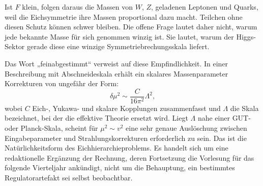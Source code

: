 Ist \(F\) klein, folgen daraus die Massen von \(W\), \(Z\), geladenen Leptonen und Quarks, weil die Eichsymmetrie ihre Massen proportional dazu macht. Teilchen ohne diesen Schutz können schwer bleiben. Die offene Frage lautet daher nicht, warum jede bekannte Masse für sich genommen winzig ist. Sie lautet, warum der Higgs-Sektor gerade diese eine winzige Symmetriebrechungsskala liefert.

\begin{classroomqa}
\end{classroomqa}

Das Wort „feinabgestimmt“ verweist auf diese Empfindlichkeit. In einer Beschreibung mit Abschneideskala erhält ein skalares Massenparameter Korrekturen von ungefähr der Form:
\begin{equation}
  \delta\mu^2
  \sim
  \frac{C}{16\pi^2}\Lambda^2,
  \label{eq:l10-higgs-quadratic-sensitivity}
\end{equation}
wobei \(C\) Eich-, Yukawa- und skalare Kopplungen zusammenfasst und \(\Lambda\) die Skala bezeichnet, bei der die effektive Theorie ersetzt wird. Liegt \(\Lambda\) nahe einer GUT- oder Planck-Skala, scheint für \(\mu^2\sim v^2\) eine sehr genaue Auslöschung zwischen Eingabeparameter und Strahlungskorrekturen erforderlich zu sein. Das ist die Natürlichkeitsform des Eichhierarchieproblems. Es handelt sich um eine redaktionelle Ergänzung der Rechnung, deren Fortsetzung die Vorlesung für das folgende Vierteljahr ankündigt, nicht um die Behauptung, ein bestimmtes Regulatorartefakt sei selbst beobachtbar.

\begin{classroomqa}
\end{classroomqa}

